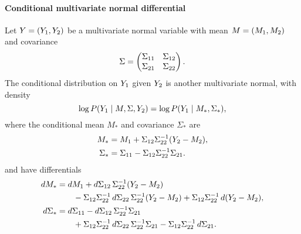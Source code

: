 \documentclass{article}
\newcommand{\Mu}{M}
\newcommand{\given}{\mathrel{|}}
\newcommand{\n}[1]{\text{\rm #1}}
\newcommand{\one}{\n1}
\newcommand{\two}{\n2}
\begin{document}
\paragraph{Conditional multivariate normal differential}
Let $Y = (Y_\one, Y_\two)$ be a multivariate normal variable with mean
 $\Mu = (\Mu_\one, \Mu_\two)$ and covariance
%
\begin{equation}
  \Sigma
    = \begin{pmatrix}
        \Sigma_{\one\one} & \Sigma_{\one\two} \\
        \Sigma_{\two\one} & \Sigma_{\two\two}
      \end{pmatrix}.
\end{equation}
%
The conditional distribution on $Y_\one$ given $Y_\two$ is another
 multivariate normal, with density
%
\begin{equation}
  \log P(Y_\one \given \Mu, \Sigma, Y_\two)
    = \log P(Y_\one \given \Mu_*, \Sigma_*),
\end{equation}
%
 where the conditional mean $\Mu_*$ and covariance $\Sigma_*$ are
\begin{align}
  \Mu_*
   &= \Mu_\one + \Sigma_{\one\two} \Sigma_{\two\two}^{-\one} (Y_\two - \Mu_\two), \\
  \Sigma_*
   &= \Sigma_{\one\one}
      - \Sigma_{\one\two} \Sigma_{\two\two}^{-\one} \Sigma_{\two\one}.
\end{align}
%
 and have differentials
%
\begin{align}
  d\Mu_*
   &= d\Mu_\one
      + d\Sigma_{\one\two}\,\Sigma_{\two\two}^{-\one} (Y_\two - \Mu_\two)
 \\&\quad\quad
      - \Sigma_{\one\two}
        \Sigma_{\two\two}^{-\one}\,d\Sigma_{\two\two}\,\Sigma_{\two\two}^{-\one}
        (Y_\two - \Mu_\two)
      + \Sigma_{\one\two} \Sigma_{\two\two}^{-\one}\,d(Y_\two - \Mu_\two),
    \nonumber\\
  d\Sigma_*
   &= d\Sigma_{\one\one}
      - d\Sigma_{\one\two}\,\Sigma_{\two\two}^{-\one} \Sigma_{\two\one}
 \\&\quad\quad
      + \Sigma_{\one\two}
        \Sigma_{\two\two}^{-\one}\,d\Sigma_{\two\two}\,\Sigma_{\two\two}^{-\one}
        \Sigma_{\two\one}
      - \Sigma_{\one\two} \Sigma_{\two\two}^{-\one}\,d\Sigma_{\two\one}.
    \nonumber
\end{align}
\end{document}
